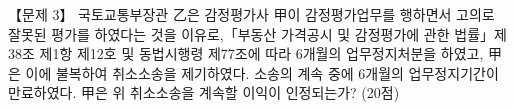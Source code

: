 \begin{longquestion}{【문제 3】}
국토교통부장관 乙은 감정평가사 甲이 감정평가업무를 행하면서 고의로 잘못된 평가를 하였다는 것을 이유로,「부동산 가격공시 및 감정평가에 관한 법률」제38조 제1항 제12호 및 동법시행령 제77조에 따라 6개월의 업무정지처분을 하였고, 甲은 이에 불복하여 취소소송을 제기하였다. 소송의 계속 중에 6개월의 업무정지기간이 만료하였다. 甲은 위 취소소송을 계속할 이익이 인정되는가? (20점) \par
\end{longquestion}
